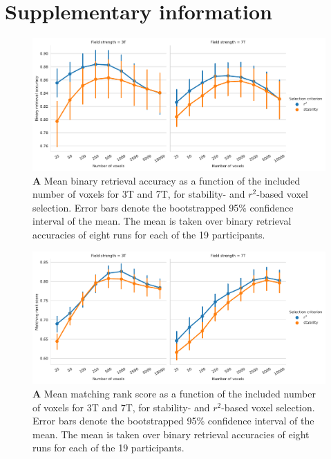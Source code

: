 \section*{Supplementary information} \label{supplemental}
\begin{figure}[H]
  \centering
  \includegraphics[width=\linewidth]{pics/binary_selection.pdf}
	
  \caption{\textbf{A} Mean binary retrieval accuracy as a function of the
  included number of voxels for 3T and 7T, for stability- and $r^2$-based
  voxel selection. Error bars denote the bootstrapped 95\% confidence interval
  of the mean. The mean is taken over binary retrieval accuracies of eight runs
  for each of the 19 participants.
}

 \label{fig:binary_retrieval_selection}\end{figure}

\begin{figure}[H]
  \centering
    \includegraphics[width=\linewidth]{pics/rank_selection.pdf}
	
  \caption{\textbf{A} Mean matching rank score as a function of the included number
  of voxels for 3T and 7T, for stability- and $r^2$-based voxel selection.
  Error bars denote the bootstrapped 95\% confidence interval of the mean. The
  mean is taken over binary retrieval accuracies of eight runs for each of the
  19 participants.}

 \label{fig:matching_score_selection}
\end{figure}


